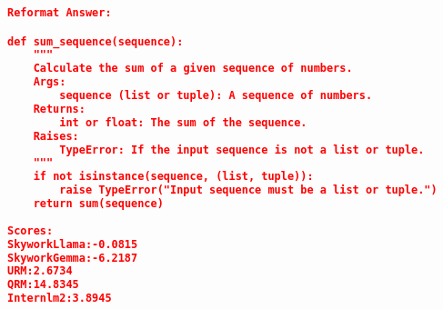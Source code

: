 \begin{lstlisting}[language=json,numbers=none]
Reformat Answer:

def sum_sequence(sequence):
    """
    Calculate the sum of a given sequence of numbers.
    Args:
        sequence (list or tuple): A sequence of numbers.
    Returns:
        int or float: The sum of the sequence.
    Raises:
        TypeError: If the input sequence is not a list or tuple.
    """
    if not isinstance(sequence, (list, tuple)):
        raise TypeError("Input sequence must be a list or tuple.")
    return sum(sequence)
    
Scores:
SkyworkLlama:-0.0815
SkyworkGemma:-6.2187
URM:2.6734
QRM:14.8345
Internlm2:3.8945
\end{lstlisting}